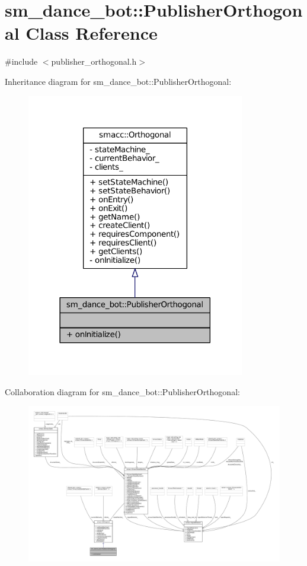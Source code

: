\hypertarget{classsm__dance__bot_1_1PublisherOrthogonal}{}\section{sm\+\_\+dance\+\_\+bot\+:\+:Publisher\+Orthogonal Class Reference}
\label{classsm__dance__bot_1_1PublisherOrthogonal}


{\ttfamily \#include $<$publisher\+\_\+orthogonal.\+h$>$}



Inheritance diagram for sm\+\_\+dance\+\_\+bot\+:\+:Publisher\+Orthogonal\+:
\nopagebreak
\begin{figure}[H]
\begin{center}
\leavevmode
\includegraphics[width=270pt]{classsm__dance__bot_1_1PublisherOrthogonal__inherit__graph}
\end{center}
\end{figure}


Collaboration diagram for sm\+\_\+dance\+\_\+bot\+:\+:Publisher\+Orthogonal\+:
\nopagebreak
\begin{figure}[H]
\begin{center}
\leavevmode
\includegraphics[width=350pt]{classsm__dance__bot_1_1PublisherOrthogonal__coll__graph}
\end{center}
\end{figure}
